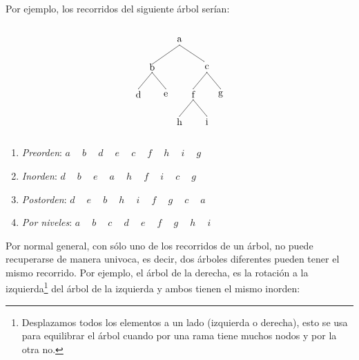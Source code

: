 \documentclass[10pt,a4paper,spanish]{report}
\begin{document}
\noindent
Por ejemplo, los recorridos del siguiente árbol serían:


\begin{minipage}{0.4\textwidth}
\begin{flushleft}
\[\begin{xy}
,(0,0)*+=<10mm>[]\txt<2cm>{a}
,(-10,-10)*+=<10mm>[]\txt<2cm>{b}
,(10,-10)*+=<10mm>[]\txt<2cm>{c}
,(-15,-20)*+=<10mm>[]\txt<2cm>{d}
,(-5,-20)*+=<10mm>[]\txt<2cm>{e}
,(5,-20)*+=<10mm>[]\txt<2cm>{f}
,(15,-20)*+=<10mm>[]\txt<2cm>{g}
,(0,-30)*+=<10mm>[]\txt<2cm>{h}
,(10,-30)*+=<10mm>[]\txt<2cm>{i}

\ar@{-} (0,-2);(-10,-9)
\ar@{-} (0,-2);(9,-8)
\ar@{-} (-10,-12);(-15,-18)
\ar@{-} (-10,-12);(-5,-18)
\ar@{-} (10,-12);(5,-18)
\ar@{-} (10,-12);(15,-18)
\ar@{-} (5,-22);(0,-28)
\ar@{-} (5,-22);(10,-28)
\end{xy}\]
\end{flushleft}
\end{minipage}
\begin{minipage}{0.6\textwidth}
\begin{flushright}
\begin{enumerate}[$\rightarrow$]
\item \textit{\textcolor[rgb]{0.3,0.4,0.8}{Preorden}}: $a \quad\ b \quad\ d \quad\ e \quad\ c \quad\ f \quad\ h \quad\ i \quad\ g$
\item \textit{\textcolor[rgb]{0.3,0.4,0.8}{Inorden}}: $d \quad\  b \quad\  e \quad\  a \quad\  h \quad\  f \quad\  i \quad\  c \quad\  g$
\item \textit{\textcolor[rgb]{0.3,0.4,0.8}{Postorden}}: $d \quad\  e \quad\  b \quad\  h \quad\  i \quad\  f \quad\  g \quad\  c  \quad\ a$
\item \textit{\textcolor[rgb]{0.3,0.4,0.8}{Por niveles}}: $a \quad\  b \quad\  c \quad\  d \quad\  e \quad\  f \quad\  g \quad\  h \quad\  i$
\end{enumerate}
\end{flushright}
\end{minipage}

\noindent
Por normal general, con sólo uno de los recorridos de un árbol, no puede recuperarse de manera univoca, es decir, dos árboles diferentes pueden tener el mismo recorrido. Por ejemplo, el árbol de la derecha, es la rotación a la izquierda\footnote{Desplazamos todos los elementos a un lado (izquierda o derecha), esto se usa para equilibrar el árbol cuando por una rama tiene muchos nodos y por la otra no.} del árbol de la izquierda y ambos tienen el mismo inorden:
\end{document}
